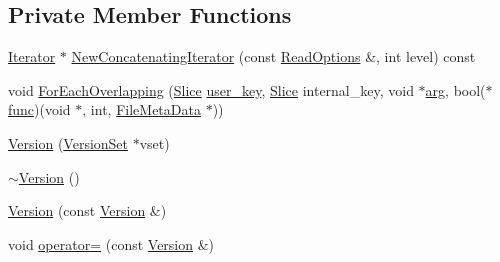 \subsection*{Private Member Functions}
\begin{DoxyCompactItemize}
\item 
\hyperlink{classleveldb_1_1_iterator}{Iterator} $\ast$ \hyperlink{classleveldb_1_1_version_a3dbfd700f06c4e31d28a6c494d6345c9}{New\-Concatenating\-Iterator} (const \hyperlink{structleveldb_1_1_read_options}{Read\-Options} \&, int level) const 
\item 
void \hyperlink{classleveldb_1_1_version_af41eeda28ad10412b2f380e920798b2c}{For\-Each\-Overlapping} (\hyperlink{classleveldb_1_1_slice}{Slice} \hyperlink{version__set_8cc_afced2118ae0bf03db7c7e75a21cfd004}{user\-\_\-key}, \hyperlink{classleveldb_1_1_slice}{Slice} internal\-\_\-key, void $\ast$\hyperlink{env__posix_8cc_a9ce2ec4812a92cb6ab39f6e81e9173a9}{arg}, bool($\ast$\hyperlink{testharness_8cc_a0a8271b25a6a647b48a0be0bc49c9409}{func})(void $\ast$, int, \hyperlink{structleveldb_1_1_file_meta_data}{File\-Meta\-Data} $\ast$))
\item 
\hyperlink{classleveldb_1_1_version_a8b08a6273383b1d02f8e3e5023e015ee}{Version} (\hyperlink{classleveldb_1_1_version_set}{Version\-Set} $\ast$vset)
\item 
\hyperlink{classleveldb_1_1_version_ade39983be24e04a74882f810fd5b61c9}{$\sim$\-Version} ()
\item 
\hyperlink{classleveldb_1_1_version_a5a1a40f16c843b73c46c8a6f7710d742}{Version} (const \hyperlink{classleveldb_1_1_version}{Version} \&)
\item 
void \hyperlink{classleveldb_1_1_version_af0d9bd79b1cdcadcf2511601de1c92a9}{operator=} (const \hyperlink{classleveldb_1_1_version}{Version} \&)
\end{DoxyCompactItemize}
